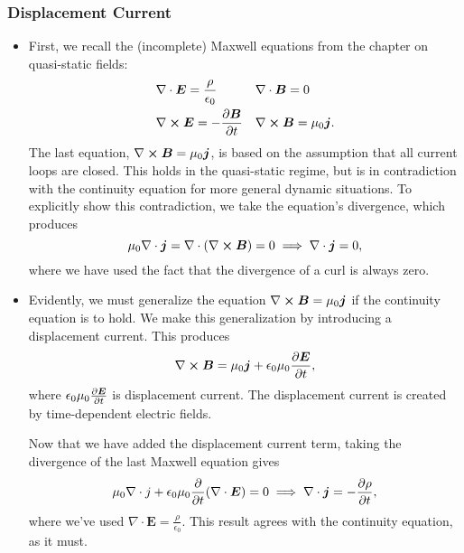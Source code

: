 \documentclass[11pt, a4paper]{article}
\renewcommand{\vec}[1]{\bm{#1}} %
\newcommand{\E}{\vec{E}} %
\newcommand{\B}{\vec{B}} %
\newcommand{\ee}{\epsilon_{0}}  %
\newcommand{\mm}{\mu_{0}}  %
\renewcommand{\j}{\vec{j}}  %
\renewcommand{\div}{\nabla \cdot}
\renewcommand{\curl}{\nabla \cross}
\begin{document}
\subsubsection{Displacement Current}
\begin{itemize}
	\item First, we recall the (incomplete) Maxwell equations from the chapter on quasi-static fields:
	\begin{align*}
		&\div \E = \frac{\rho}{\ee} && \div \B = 0\\
		& \curl \E = - \pdv{\B}{t} && \curl \B = \mm \j.
	\end{align*}
	The last equation, $ \curl \B = \mm \j $, is based on the assumption that all current loops are closed. This holds in the quasi-static regime, but is in contradiction with the continuity equation for more general dynamic situations. To explicitly show this contradiction, we take the equation's divergence, which produces
	\begin{equation*}
		\mm \div \j = \div (\curl \B) = 0 \implies \div \j = 0,
	\end{equation*}
    where we have used the fact that the divergence of a curl is always zero. 

    \item Evidently, we must generalize the equation $ \curl \B = \mm \j $ if the continuity equation is to hold. We make this generalization by introducing a displacement current. This produces
	\begin{equation*}
		\curl \B = \mm \j + \ee \mm \pdv{\E}{t},
	\end{equation*}
	where $ \ee \mm \pdv{\E}{t} $ is displacement current. The displacement current is created by time-dependent electric fields. 

    Now that we have added the displacement current term, taking the divergence of the last Maxwell equation gives
	\begin{equation*}
		\mm \div j + \ee \mm \pdv{t}(\div \E) = 0 \implies \div \j = - \pdv{\rho}{t},
	\end{equation*}
	where we've used $ \div \E = \frac{\rho}{\ee} $. This result agrees with the continuity equation, as it must.
	
\end{itemize}
\end{document}
